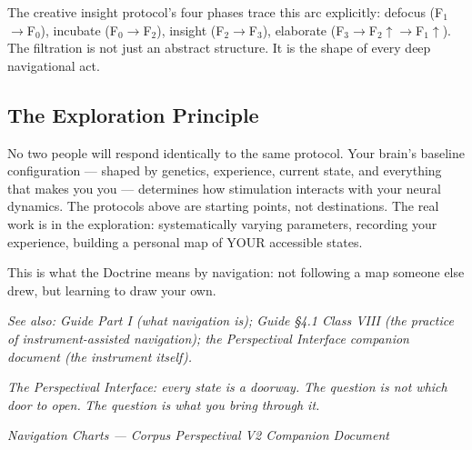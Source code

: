 The creative insight protocol's four phases trace this arc explicitly: defocus (F$_1$$\rightarrow$F$_0$), incubate (F$_0$$\rightarrow$F$_2$), insight (F$_2$$\rightarrow$F$_3$), elaborate (F$_3$$\rightarrow$F$_2$$\uparrow$$\rightarrow$F$_1$$\uparrow$). The filtration is not just an abstract structure. It is the shape of every deep navigational act.


\subsection*{The Exploration Principle}


No two people will respond identically to the same protocol. Your brain's baseline configuration — shaped by genetics, experience, current state, and everything that makes you you — determines how stimulation interacts with your neural dynamics. The protocols above are starting points, not destinations. The real work is in the exploration: systematically varying parameters, recording your experience, building a personal map of YOUR accessible states.


This is what the Doctrine means by navigation: not following a map someone else drew, but learning to draw your own.


\textit{See also: Guide Part I (what navigation is); Guide §4.1 Class VIII (the practice of instrument-assisted navigation); the Perspectival Interface companion document (the instrument itself).}


\bigskip\noindent\makebox[\textwidth]{\color{rulegray}\rule{5cm}{0.3pt}}\bigskip


\textit{The Perspectival Interface: every state is a doorway.} \textit{The question is not which door to open.} \textit{The question is what you bring through it.}


\textit{Navigation Charts — Corpus Perspectival V2 Companion Document}


